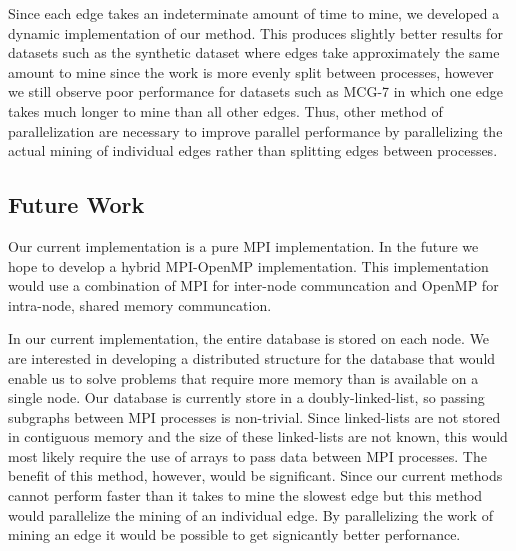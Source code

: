 Since each edge takes an indeterminate amount of time to mine, we developed
a dynamic implementation of our method. This produces slightly better results
for datasets such as the synthetic dataset where edges take approximately
the same amount to mine since the work is more evenly split between processes,
however we still observe poor performance for datasets such as MCG-7 in which
one edge takes much longer to mine than all other edges.
Thus, other method of parallelization are necessary to improve parallel
performance by parallelizing the actual mining of individual edges rather
than splitting edges between processes.

\subsection{Future Work}
\label{subsec:future}

Our current implementation is a pure MPI implementation. In the future we
hope to develop a hybrid MPI-OpenMP implementation. This implementation
would use a combination of MPI for inter-node communcation and OpenMP
for intra-node, shared memory communcation.

In our current implementation, the entire database is stored on each node.
We are interested in developing a distributed structure for the database that
would enable us to solve problems that require more memory than is available
on a single node. Our database is currently store in a doubly-linked-list, so
passing subgraphs between MPI processes is non-trivial. Since
linked-lists are not stored in contiguous memory and the size of these
linked-lists are not known, this would most likely require the use of arrays
to pass data between MPI processes.
The benefit of this method, however, would be significant. Since our current
methods cannot perform faster than it takes to mine the slowest edge but this
method would parallelize the mining of an individual edge. By parallelizing
the work of mining an edge it would be possible to get signicantly better
perfornance.
